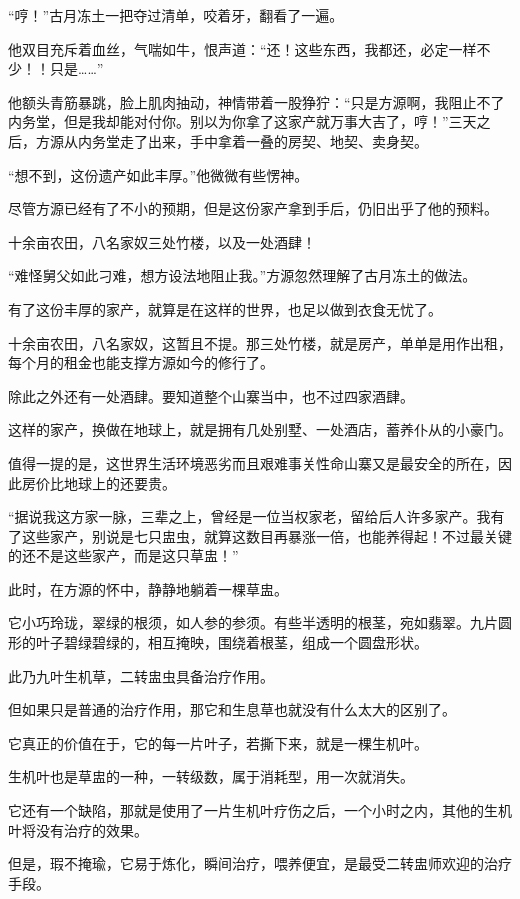 \begin{this_body}
“哼！”古月冻土一把夺过清单，咬着牙，翻看了一遍。

他双目充斥着血丝，气喘如牛，恨声道：“还！这些东西，我都还，必定一样不少！！只是……”

他额头青筋暴跳，脸上肌肉抽动，神情带着一股狰狞：“只是方源啊，我阻止不了内务堂，但是我却能对付你。别以为你拿了这家产就万事大吉了，哼！”三天之后，方源从内务堂走了出来，手中拿着一叠的房契、地契、卖身契。

“想不到，这份遗产如此丰厚。”他微微有些愣神。

尽管方源已经有了不小的预期，但是这份家产拿到手后，仍旧出乎了他的预料。

十余亩农田，八名家奴三处竹楼，以及一处酒肆！

“难怪舅父如此刁难，想方设法地阻止我。”方源忽然理解了古月冻土的做法。

有了这份丰厚的家产，就算是在这样的世界，也足以做到衣食无忧了。

十余亩农田，八名家奴，这暂且不提。那三处竹楼，就是房产，单单是用作出租，每个月的租金也能支撑方源如今的修行了。

除此之外还有一处酒肆。要知道整个山寨当中，也不过四家酒肆。

这样的家产，换做在地球上，就是拥有几处别墅、一处酒店，蓄养仆从的小豪门。

值得一提的是，这世界生活环境恶劣而且艰难事关性命山寨又是最安全的所在，因此房价比地球上的还要贵。

“据说我这方家一脉，三辈之上，曾经是一位当权家老，留给后人许多家产。我有了这些家产，别说是七只盅虫，就算这数目再暴涨一倍，也能养得起！不过最关键的还不是这些家产，而是这只草盅！”

此时，在方源的怀中，静静地躺着一棵草盅。

它小巧玲珑，翠绿的根须，如人参的参须。有些半透明的根茎，宛如翡翠。九片圆形的叶子碧绿碧绿的，相互掩映，围绕着根茎，组成一个圆盘形状。

此乃九叶生机草，二转盅虫具备治疗作用。

但如果只是普通的治疗作用，那它和生息草也就没有什么太大的区别了。

它真正的价值在于，它的每一片叶子，若撕下来，就是一棵生机叶。

生机叶也是草盅的一种，一转级数，属于消耗型，用一次就消失。

它还有一个缺陷，那就是使用了一片生机叶疗伤之后，一个小时之内，其他的生机叶将没有治疗的效果。

但是，瑕不掩瑜，它易于炼化，瞬间治疗，喂养便宜，是最受二转盅师欢迎的治疗手段。


\end{this_body}
